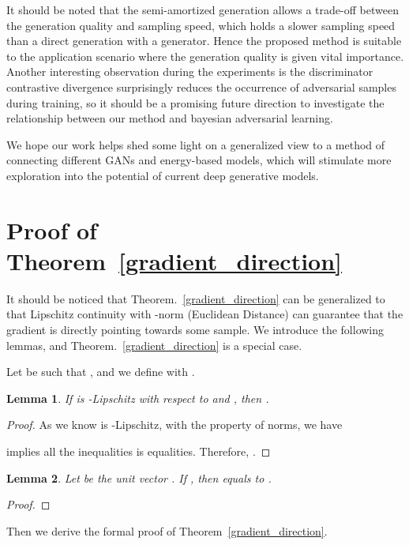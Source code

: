 \documentclass{article}
\newtheorem{lemma}{Lemma}
\begin{document}
It should be noted that the semi-amortized generation allows a trade-off between the generation quality and sampling speed, which holds a slower sampling speed than a direct generation with a generator. Hence the proposed method is suitable to the application scenario where the generation quality is given vital importance.  Another interesting observation during the experiments is the discriminator contrastive divergence surprisingly reduces the occurrence of adversarial samples during training, so it should be a promising future direction to investigate the relationship between our method and bayesian adversarial learning. 

We hope our work helps shed some light on a generalized view to a method of connecting different GANs and energy-based models, which will stimulate more exploration into the potential of current deep generative models.


\newpage





\onecolumn
\appendix
\section{Proof of Theorem~\ref{gradient_direction}}\label{proof1}
It should be noticed that Theorem.~\ref{gradient_direction} can be generalized to that Lipschitz continuity with -norm (Euclidean Distance) can guarantee that the gradient is directly pointing towards some sample\cite{zhou2019lipschitz}. We introduce the following lemmas, and Theorem.~\ref{gradient_direction} is a special case.  

Let  be such that , and we define  with . 

\begin{lemma}
If  is -Lipschitz with respect to  and , then .
\end{lemma} 

\begin{proof}
As we know  is -Lipschitz, with the property of norms, we have

 implies all the inequalities is equalities. Therefore, . \qedhere
\end{proof}

\begin{lemma}
Let  be the unit vector . If , then  equals to . 
\end{lemma}

\begin{proof}

\end{proof}
Then we derive the formal proof of Theorem~\ref{gradient_direction}. 
\end{document}
